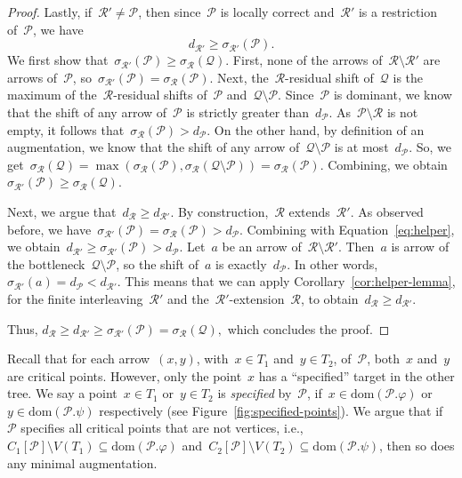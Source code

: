 \documentclass[a4paper,UKenglish, autoref, thm-restate, cleveref]{lipics-v2021}
\newcommand{\dom}{\mathrm{dom}}
\newcommand{\shift}[1]{\sigma_{#1}}
\newcommand{\resdist}[1]{d_{#1}}
\renewcommand{\phi}{\varphi}
\renewcommand{\P}{\mathcal{P}}
\newcommand{\Q}{\mathcal{Q}}
\newcommand{\R}{\mathcal{R}}
\begin{document}
\begin{proof}
    Lastly, if~$\R' \neq \P$, then since~$\P$ is locally correct and~$\R'$ is a restriction of~$\P$, we have
    \begin{equation}\label{eq:helper}
        \resdist{\R'} \ge \shift{\R'}(\P).
    \end{equation}
    We first show that~$\shift{\R'}(\P) \ge \shift{\R}(\Q)$.
    First, none of the arrows of~$\R \setminus \R'$ are arrows of~$\P$, so~$\shift{\R'}(\P) = \shift{\R}(\P)$.
    Next, the~$\R$-residual shift of~$\Q$ is the maximum of the~$\R$-residual shifts of~$\P$ and~$\Q \setminus \P$.
    Since~$\P$ is dominant, we know that the shift of any arrow of~$\P$ is strictly greater than~$\resdist{\P}$.
    As~$\P \setminus \R$ is not empty, it follows that~$\shift{\R}(\P) > \resdist{\P}$.
    On the other hand, by definition of an augmentation, we know that the shift of any arrow of~$\Q \setminus \P$ is at most~$\resdist{\P}$.
    So, we get~$\shift{\R}(\Q) = \max(\shift{\R}(\P), \shift{\R}(\Q \setminus \P)) = \shift{\R}(\P)$.
    Combining, we obtain~$\shift{\R'}(\P) \ge \shift{\R}(\Q)$.

    Next, we argue that~$\resdist{\R} \ge \resdist{\R'}$.
    By construction,~$\R$ extends~$\R'$.
    As observed before, we have~$\shift{\R'}(\P) = \shift{\R}(\P) > \resdist{\P}$.
    Combining with Equation~\eqref{eq:helper}, we obtain~$\resdist{\R'} \ge \shift{\R'}(\P) > \resdist{\P}$.
    Let~$a$ be an arrow of~$\R \setminus \R'$.
    Then~$a$ is arrow of the bottleneck~$\Q \setminus \P$, so the shift of~$a$ is exactly~$\resdist{\P}$.
    In other words,~$\shift{\R'}(a) = \resdist{\P} < \resdist{\R'}$.
    This means that we can apply Corollary~\ref{cor:helper-lemma}, for the finite interleaving~$\R'$ and the~$\R'$-extension~$\R$, to obtain~$\resdist{\R} \ge \resdist{\R'}$.
    
    Thus, $
        \resdist{\R} \ge \resdist{\R'} \ge \shift{\R'}(\P) = \shift{\R}(\Q),
    $
    which concludes the proof.
\end{proof}

\noindent
Recall that for each arrow~$(x, y)$, with~$x \in T_1$ and~$y \in T_2$, of~$\P$, both~$x$ and~$y$ are critical points.
However, only the point~$x$ has a ``specified'' target in the other tree.
We say a point~$x \in T_1$ or~$y \in T_2$ is \emph{specified} by~$\P$, if~$x \in \dom(\P.\phi)$ or~$y \in \dom(\P.\psi)$ respectively (see Figure~\ref{fig:specified-points}).
We argue that if~$\P$ specifies all critical points that are not vertices, i.e.,~$C_1[\P] \setminus V(T_1) \subseteq \dom(\P.\phi)$ and~$C_2[\P] \setminus V(T_2) \subseteq \dom(\P.\psi)$, then so does any minimal augmentation.
\end{document}
